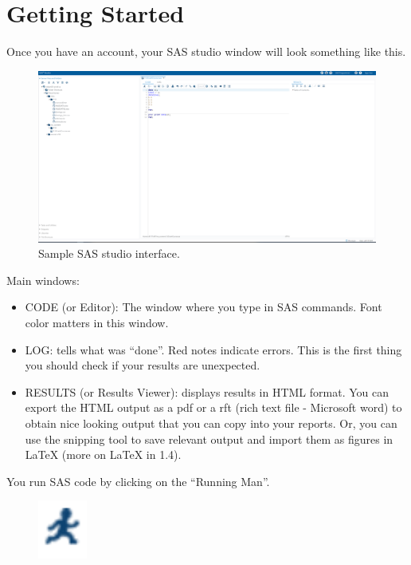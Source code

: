 \documentclass[12pt]{../notes}
\begin{document}
\section{Getting Started}
Once you have an account, your SAS studio window will look something like this. 
\begin{figure}[H]
\includegraphics[width = \textwidth]{../figures/module1/SASstudio.png}
\caption{Sample SAS studio interface.}
\end{figure}

\nspace
Main windows:
\begin{itemize}
\item CODE (or Editor): The window where you type in SAS commands. Font color matters in this window. 
\item LOG: tells what was ``done''. Red notes indicate errors. This is the first thing you should check if your results are unexpected. 
\item RESULTS (or Results Viewer): displays results in HTML format. You can export the HTML output as a pdf or a rft (rich text file - Microsoft word) to obtain nice looking output that you can copy into your reports. Or, you can use the snipping tool to save relevant output and import them as figures in LaTeX (more on LaTeX in 1.4). 
\end{itemize}


You run SAS code by clicking on the ``Running Man''. 


\begin{figure}[H]
\centering
\includegraphics{../figures/module1/runningman.png}
\end{figure}
\end{document}
